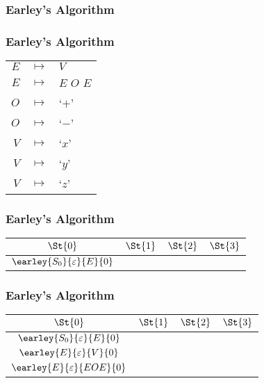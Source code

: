 
\begin{frame}
	\frametitle{Earley's Algorithm}
\end{frame}

\begin{frame}
	\frametitle{Earley's Algorithm}
	\centering
	\begin{tabular}{rcl}
		$E$ & $ \mapsto $ & $V$ \\
		$E$ & $ \mapsto $ & $E$ $O$ $E$ \\
		$O$ & $ \mapsto $ & `$+$' \\
		$O$ & $ \mapsto $ & `$-$' \\
		$V$ & $ \mapsto $ & `$x$' \\
		$V$ & $ \mapsto $ & `$y$' \\
		$V$ & $ \mapsto $ & `$z$'
	\end{tabular}
\end{frame}

\begin{frame}
	\frametitle{Earley's Algorithm}
	\centering
	\begin{tabular}{|c|c|c|c|}
		\hline
		$\St{0}$ & $\St{1}$ & $\St{2}$ & $\St{3}$ \\
		\hline
		$\earley{S_0}{\varepsilon}{E}{0}$ & & & \\
		\hline
	\end{tabular}
\end{frame}

\begin{frame}
	\frametitle{Earley's Algorithm}
	\centering
	\begin{tabular}{|c|c|c|c|}
		\hline
		$\St{0}$ & $\St{1}$ & $\St{2}$ & $\St{3}$ \\
		\hline
		$\earley{S_0}{\varepsilon}{E}{0}$ & & & \\
		$\earley{E}{\varepsilon}{V}{0}$   & & & \\
		$\earley{E}{\varepsilon}{EOE}{0}$ & & & \\
		\hline
	\end{tabular}
\end{frame}


